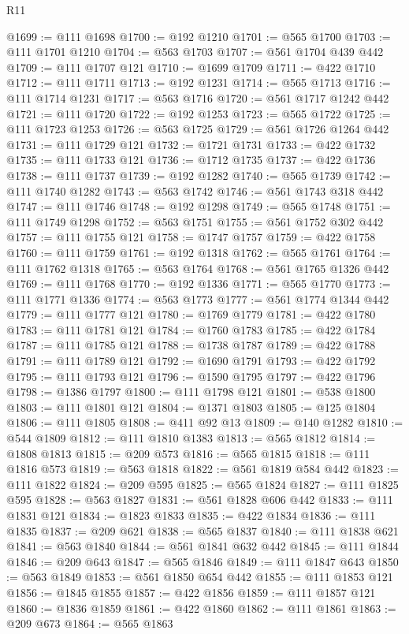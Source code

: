 \begin{lexlean}{R11}
\begin{coremodule}
@1699 := @111 @1698
@1700 := @192 @1210
@1701 := @565 @1700
@1703 := @111 @1701 @1210
@1704 := @563 @1703
@1707 := @561 @1704 @439 @442
@1709 := @111 @1707 @121
@1710 := @1699 @1709
@1711 := @422 @1710
@1712 := @111 @1711
@1713 := @192 @1231
@1714 := @565 @1713
@1716 := @111 @1714 @1231
@1717 := @563 @1716
@1720 := @561 @1717 @1242 @442
@1721 := @111 @1720
@1722 := @192 @1253
@1723 := @565 @1722
@1725 := @111 @1723 @1253
@1726 := @563 @1725
@1729 := @561 @1726 @1264 @442
@1731 := @111 @1729 @121
@1732 := @1721 @1731
@1733 := @422 @1732
@1735 := @111 @1733 @121
@1736 := @1712 @1735
@1737 := @422 @1736
@1738 := @111 @1737
@1739 := @192 @1282
@1740 := @565 @1739
@1742 := @111 @1740 @1282
@1743 := @563 @1742
@1746 := @561 @1743 @318 @442
@1747 := @111 @1746
@1748 := @192 @1298
@1749 := @565 @1748
@1751 := @111 @1749 @1298
@1752 := @563 @1751
@1755 := @561 @1752 @302 @442
@1757 := @111 @1755 @121
@1758 := @1747 @1757
@1759 := @422 @1758
@1760 := @111 @1759
@1761 := @192 @1318
@1762 := @565 @1761
@1764 := @111 @1762 @1318
@1765 := @563 @1764
@1768 := @561 @1765 @1326 @442
@1769 := @111 @1768
@1770 := @192 @1336
@1771 := @565 @1770
@1773 := @111 @1771 @1336
@1774 := @563 @1773
@1777 := @561 @1774 @1344 @442
@1779 := @111 @1777 @121
@1780 := @1769 @1779
@1781 := @422 @1780
@1783 := @111 @1781 @121
@1784 := @1760 @1783
@1785 := @422 @1784
@1787 := @111 @1785 @121
@1788 := @1738 @1787
@1789 := @422 @1788
@1791 := @111 @1789 @121
@1792 := @1690 @1791
@1793 := @422 @1792
@1795 := @111 @1793 @121
@1796 := @1590 @1795
@1797 := @422 @1796
@1798 := @1386 @1797
@1800 := @111 @1798 @121
@1801 := @538 @1800
@1803 := @111 @1801 @121
@1804 := @1371 @1803
@1805 := @125 @1804
@1806 := @111 @1805
@1808 := @411 @92 @13
@1809 := @140 @1282
@1810 := @544 @1809
@1812 := @111 @1810 @1383
@1813 := @565 @1812
@1814 := @1808 @1813
@1815 := @209 @573
@1816 := @565 @1815
@1818 := @111 @1816 @573
@1819 := @563 @1818
@1822 := @561 @1819 @584 @442
@1823 := @111 @1822
@1824 := @209 @595
@1825 := @565 @1824
@1827 := @111 @1825 @595
@1828 := @563 @1827
@1831 := @561 @1828 @606 @442
@1833 := @111 @1831 @121
@1834 := @1823 @1833
@1835 := @422 @1834
@1836 := @111 @1835
@1837 := @209 @621
@1838 := @565 @1837
@1840 := @111 @1838 @621
@1841 := @563 @1840
@1844 := @561 @1841 @632 @442
@1845 := @111 @1844
@1846 := @209 @643
@1847 := @565 @1846
@1849 := @111 @1847 @643
@1850 := @563 @1849
@1853 := @561 @1850 @654 @442
@1855 := @111 @1853 @121
@1856 := @1845 @1855
@1857 := @422 @1856
@1859 := @111 @1857 @121
@1860 := @1836 @1859
@1861 := @422 @1860
@1862 := @111 @1861
@1863 := @209 @673
@1864 := @565 @1863

\end{coremodule}
\end{lexlean}
